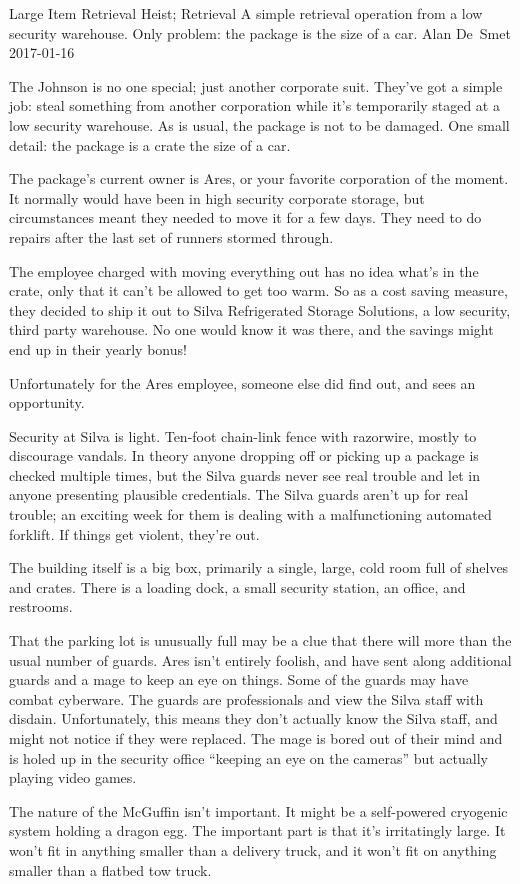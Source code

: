 \begin{scenario}{Large Item Retrieval}
	{Heist; Retrieval}
	{A simple retrieval operation from a low security warehouse. Only problem: the package is the size of a car.}
	{Alan De~Smet}
	{2017-01-16}
	{}

 The Johnson is no one special; just another corporate suit.  They've got a simple job: steal something from another corporation while it's temporarily staged at a low security warehouse.  As is usual, the package is not to be damaged.  One small detail: the package is a crate the size of a car.

\synopsis  The package's current owner is Ares, or your favorite corporation of the moment.  It normally would have been in high security corporate storage, but circumstances meant they needed to move it for a few days. They need to do repairs after the last set of runners stormed through.

The employee charged with moving everything out has no idea what's in the crate, only that it can't be allowed to get too warm. So as a cost saving measure, they decided to ship it out to Silva Refrigerated Storage Solutions, a low security, third party warehouse.  No one would know it was there, and the savings might end up in their yearly bonus!

Unfortunately for the Ares employee, someone else did find out, and sees an opportunity.


\notes  Security at Silva is light. Ten-foot chain-link fence with razorwire, mostly to discourage vandals.  In theory anyone dropping off or picking up a package is checked multiple times, but the Silva guards never see real trouble and let in anyone presenting plausible credentials.  The Silva guards aren't up for real trouble; an exciting week for them is dealing with a malfunctioning automated forklift. If things get violent, they're out.

The building itself is a big box, primarily a single, large, cold room full of shelves and crates. There is a loading dock, a small security station, an office, and restrooms.

That the parking lot is unusually full may be a clue that there will more than the usual number of guards.
Ares isn't entirely foolish, and have sent along additional guards and a mage to keep an eye on things.  Some of the guards may have combat cyberware.  The guards are professionals and view the Silva staff with disdain. Unfortunately, this means they don't actually know the Silva staff, and might not notice if they were replaced.  The mage is bored out of their mind and is holed up in the security office ``keeping an eye on the cameras'' but actually playing video games.

The nature of the McGuffin isn't important. It might be a self-powered cryogenic system holding a dragon egg.  The important part is that it's irritatingly large.  It won't fit in anything smaller than a delivery truck, and it won't fit on anything smaller than a flatbed tow truck.


\end{scenario}
